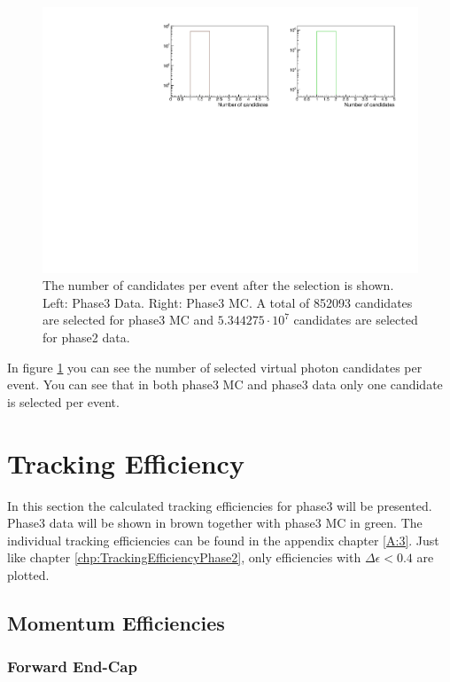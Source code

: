 \documentclass[a4paper,11pt,twosided,final,german,openbib,pdftex,listof=totoc,bibliography=totoc]{scrbook}
\begin{document}
\begin{figure}[h!]
	\includegraphics[width=\textwidth]{Plots/master3/CCandP3.pdf}
	\caption[Total Number Of Events After The Selection Phase3]{The number of candidates per event after the selection is shown. Left: Phase3 Data. Right: Phase3 MC. A total of 852093 candidates are selected for phase3 MC and $5.344275\cdot10^7$ candidates are selected for phase2 data.}
	\label{fig:nCandAS3}
\end{figure}

In figure \ref{fig:nCandAS3} you can see the number of selected virtual photon candidates per event. You can see that in both phase3 MC and phase3 data only one candidate is selected per event.


\clearpage

\section{Tracking Efficiency}

In this section the calculated tracking efficiencies for phase3 will be presented.  Phase3 data will be shown in brown together with phase3 MC in green. The individual tracking efficiencies can be found in the appendix chapter \ref{A:3}. Just like chapter \ref{chp:TrackingEfficiencyPhase2}, only efficiencies with $\Delta \epsilon < 0.4$ are plotted.


\subsection{Momentum Efficiencies}


\subsubsection{Forward End-Cap}
\end{document}
